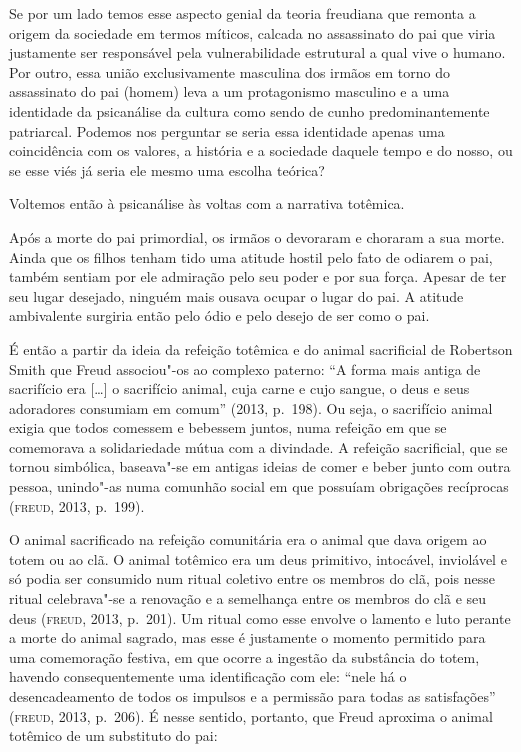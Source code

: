 Se por um lado temos esse aspecto genial da teoria freudiana que remonta
a origem da sociedade em termos míticos, calcada no assassinato do pai
que viria justamente ser responsável pela vulnerabilidade estrutural a
qual vive o humano. Por outro, essa união exclusivamente masculina dos
irmãos em torno do assassinato do pai (homem) leva a um protagonismo
masculino e a uma identidade da psicanálise da cultura como sendo de
cunho predominantemente patriarcal. Podemos nos perguntar se seria essa
identidade apenas uma coincidência com os valores, a história e a
sociedade daquele tempo e do nosso, ou se esse viés já seria ele mesmo
uma escolha teórica?

Voltemos então à psicanálise às voltas com a narrativa totêmica.

Após a morte do pai primordial, os irmãos o devoraram e choraram a sua
morte. Ainda que os filhos tenham tido uma atitude hostil pelo fato de
odiarem o pai, também sentiam por ele admiração pelo seu poder e por sua
força. Apesar de ter seu lugar desejado, ninguém mais ousava ocupar o
lugar do pai. A atitude ambivalente surgiria então pelo ódio e pelo
desejo de ser como o pai.

É então a partir da ideia da refeição totêmica e do animal sacrificial
de Robertson Smith que Freud associou"-os ao complexo paterno: ``A forma
mais antiga de sacrifício era {[}\ldots{}{]} o sacrifício animal, cuja carne
e cujo sangue, o deus e seus adoradores consumiam em comum'' (2013, p.~198). Ou seja, o sacrifício animal exigia que todos comessem e bebessem juntos,
numa refeição em que se comemorava a
solidariedade mútua com a divindade. A refeição sacrificial, que se
tornou simbólica, baseava"-se em antigas ideias de comer e beber
junto com outra pessoa, unindo"-as numa comunhão social em que possuíam
obrigações recíprocas (\textsc{freud}, 2013, p.~199).

O animal sacrificado na refeição comunitária era o animal que dava
origem ao totem ou ao clã. O animal totêmico era um deus primitivo,
intocável, inviolável e só podia ser consumido num ritual coletivo entre
os membros do clã, pois nesse ritual celebrava"-se a renovação e a
semelhança entre os membros do clã e seu deus (\textsc{freud}, 2013, p.~201). Um ritual como esse envolve o lamento e luto perante a morte do
animal sagrado, mas esse é justamente o momento permitido para uma
comemoração festiva, em que ocorre a ingestão da substância do totem,
havendo consequentemente uma identificação com ele: ``nele há o
desencadeamento de todos os impulsos e a permissão para todas as
satisfações'' (\textsc{freud}, 2013, p.~206). É nesse sentido, portanto, que
Freud aproxima o animal totêmico de um substituto do pai:

